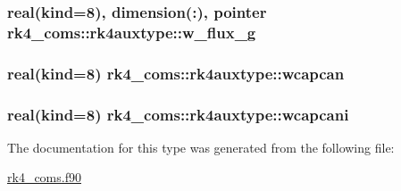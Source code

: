 \subsubsection[{\texorpdfstring{w\+\_\+flux\+\_\+g}{w_flux_g}}]{\setlength{\rightskip}{0pt plus 5cm}real(kind=8), dimension(\+:), pointer rk4\+\_\+coms\+::rk4auxtype\+::w\+\_\+flux\+\_\+g}\hypertarget{structrk4__coms_1_1rk4auxtype_a35a7768804c49946386dc93198567136}{}\label{structrk4__coms_1_1rk4auxtype_a35a7768804c49946386dc93198567136}
\subsubsection[{\texorpdfstring{wcapcan}{wcapcan}}]{\setlength{\rightskip}{0pt plus 5cm}real(kind=8) rk4\+\_\+coms\+::rk4auxtype\+::wcapcan}\hypertarget{structrk4__coms_1_1rk4auxtype_aaf2a25af6a8bc658149b4cce183ebdfd}{}\label{structrk4__coms_1_1rk4auxtype_aaf2a25af6a8bc658149b4cce183ebdfd}
\subsubsection[{\texorpdfstring{wcapcani}{wcapcani}}]{\setlength{\rightskip}{0pt plus 5cm}real(kind=8) rk4\+\_\+coms\+::rk4auxtype\+::wcapcani}\hypertarget{structrk4__coms_1_1rk4auxtype_af38a4e719b1ba86c3cfd3bb54942de0e}{}\label{structrk4__coms_1_1rk4auxtype_af38a4e719b1ba86c3cfd3bb54942de0e}


The documentation for this type was generated from the following file\+:\begin{DoxyCompactItemize}
\item 
\hyperlink{rk4__coms_8f90}{rk4\+\_\+coms.\+f90}\end{DoxyCompactItemize}
